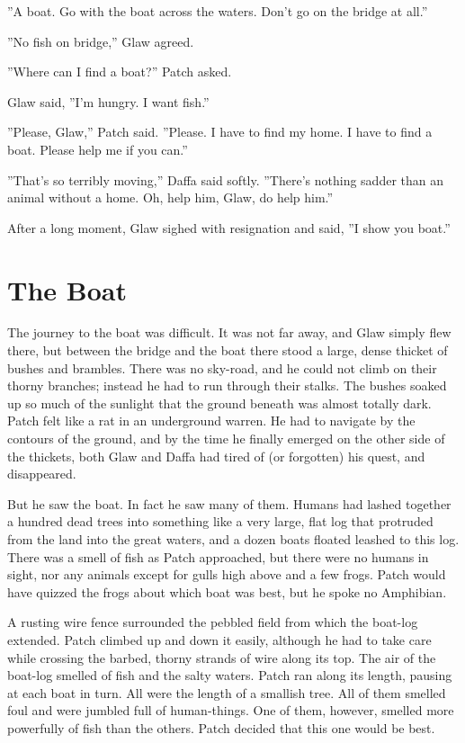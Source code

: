 \documentclass[12pt]{book}
\begin{document}
''A boat. Go with the boat across the waters. Don't go on the bridge
at all.''

''No fish on bridge,'' Glaw agreed.

''Where can I find a boat?'' Patch asked.

Glaw said, ''I'm hungry. I want fish.''

''Please, Glaw,'' Patch said. ''Please. I have to find my home. I have
to find a boat. Please help me if you can.''

''That's so terribly moving,'' Daffa said softly. ''There's nothing
sadder than an animal without a home. Oh, help him, Glaw, do help
him.''

After a long moment, Glaw sighed with resignation and said, ''I show
you boat.''


\section{The Boat}

The journey to the boat was difficult. It was not far away, and Glaw
simply flew there, but between the bridge and the boat there stood a
large, dense thicket of bushes and brambles. There was no sky-road,
and he could not climb on their thorny branches; instead he had to run
through their stalks. The bushes soaked up so much of the sunlight
that the ground beneath was almost totally dark. Patch felt like a rat
in an underground warren. He had to navigate by the contours of the
ground, and by the time he finally emerged on the other side of the
thickets, both Glaw and Daffa had tired of (or forgotten) his quest,
and disappeared.

But he saw the boat. In fact he saw many of them. Humans had lashed
together a hundred dead trees into something like a very large, flat
log that protruded from the land into the great waters, and a dozen
boats floated leashed to this log. There was a smell of fish as Patch
approached, but there were no humans in sight, nor any animals except
for gulls high above and a few frogs. Patch would have quizzed the
frogs about which boat was best, but he spoke no Amphibian.

A rusting wire fence surrounded the pebbled field from which the
boat-log extended. Patch climbed up and down it easily, although he
had to take care while crossing the barbed, thorny strands of wire
along its top. The air of the boat-log smelled of fish and the salty
waters. Patch ran along its length, pausing at each boat in turn. All
were the length of a smallish tree. All of them smelled foul and were
jumbled full of human-things. One of them, however, smelled more
powerfully of fish than the others. Patch decided that this one would
be best.
\end{document}
